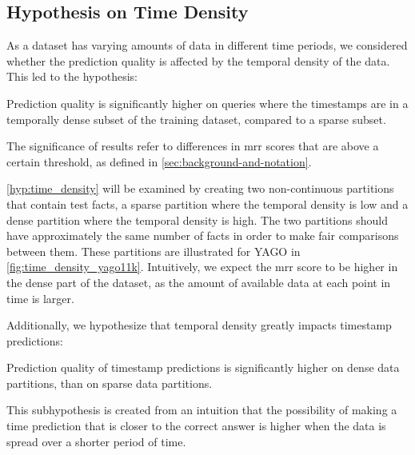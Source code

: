 \subsection{Hypothesis on Time Density}
\label{sec:hypothesis_time_density}

As a dataset has varying amounts of data in different time periods, we considered whether the prediction quality is affected by the temporal density of the data. This led to the hypothesis:

\begin{hypothesis}
\label{hyp:time_density}
Prediction quality is significantly higher on queries where the timestamps are in a temporally dense subset of the training dataset, compared to a sparse subset.
\end{hypothesis}

The significance of results refer to differences in \gls{mrr} scores that are above a certain threshold, as defined in \autoref{sec:background-and-notation}.

%
%


\autoref{hyp:time_density} will be examined by creating two non-continuous partitions that contain test facts, a sparse partition where the temporal density is low and a dense partition where the temporal density is high. The two partitions should have approximately the same number of facts in order to make fair comparisons between them.
These partitions are illustrated for YAGO in \autoref{fig:time_density_yago11k}. Intuitively, we expect the \gls{mrr} score to be higher in the dense part of the dataset, as the amount of available data at each point in time is larger.

Additionally, we hypothesize that temporal density greatly impacts timestamp predictions:

\begin{subhypothesis}
\label{hyp:time_density_timestamp}
Prediction quality of timestamp predictions is significantly higher on dense data partitions, than on sparse data partitions.
\end{subhypothesis}

This subhypothesis is created from an intuition that the possibility of making a time prediction that is closer to the correct answer is higher when the data is spread over a shorter period of time.

